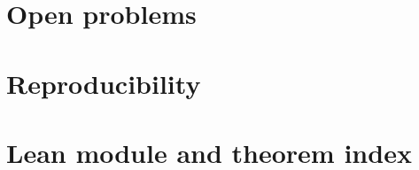 \documentclass[11pt]{article}
\theoremstyle{definition}
\begin{document}
\section{Open problems}\label{sec:open}

\appendix
\section{Reproducibility}\label{app:repro}
\section{Lean module and theorem index}\label{app:index}



\end{document}
